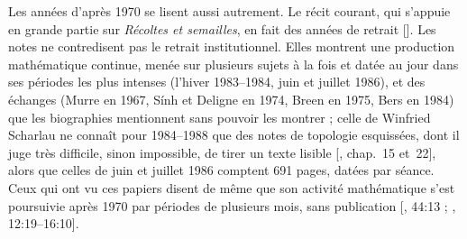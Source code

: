 \documentclass[11pt]{amsart}
\newcommand{\ts}[1]{\foreignlanguage{english}{#1}}
\begin{document}
Les années d'après 1970 se lisent aussi autrement. Le récit courant, qui s'appuie en grande partie sur \emph{Récoltes et semailles}, en fait des années de retrait [\citealp{jackson2004}]. Les notes ne contredisent pas le retrait institutionnel. Elles montrent une production mathématique continue, menée sur plusieurs sujets à la fois et datée au jour dans ses périodes les plus intenses (l'hiver 1983--1984, juin et juillet 1986), et des échanges (Murre en 1967, Sính et Deligne en 1974, Breen en 1975, Bers en 1984) que les biographies mentionnent sans pouvoir les montrer ; celle de Winfried Scharlau ne connaît pour 1984--1988 que des notes de topologie esquissées, dont il juge très difficile, sinon impossible, de tirer un texte lisible [\citealp{circle-spirit}, chap.~15 et~22], alors que celles de juin et juillet 1986 comptent 691 pages, datées par séance. Ceux qui ont vu ces papiers disent de même que son activité mathématique s'est poursuivie après 1970 par périodes de plusieurs mois, sans publication [\citealp{schneps2026}, \ts{44:13} ; \citealp{toen2025}, \ts{12:19--16:10}].
\end{document}

